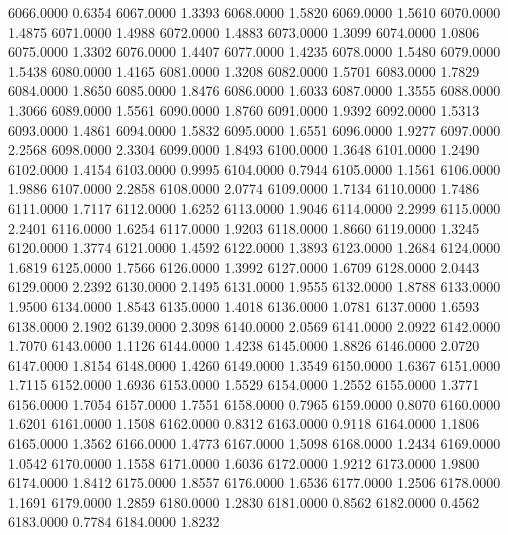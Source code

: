 6066.0000      0.6354
6067.0000      1.3393
6068.0000      1.5820
6069.0000      1.5610
6070.0000      1.4875
6071.0000      1.4988
6072.0000      1.4883
6073.0000      1.3099
6074.0000      1.0806
6075.0000      1.3302
6076.0000      1.4407
6077.0000      1.4235
6078.0000      1.5480
6079.0000      1.5438
6080.0000      1.4165
6081.0000      1.3208
6082.0000      1.5701
6083.0000      1.7829
6084.0000      1.8650
6085.0000      1.8476
6086.0000      1.6033
6087.0000      1.3555
6088.0000      1.3066
6089.0000      1.5561
6090.0000      1.8760
6091.0000      1.9392
6092.0000      1.5313
6093.0000      1.4861
6094.0000      1.5832
6095.0000      1.6551
6096.0000      1.9277
6097.0000      2.2568
6098.0000      2.3304
6099.0000      1.8493
6100.0000      1.3648
6101.0000      1.2490
6102.0000      1.4154
6103.0000      0.9995
6104.0000      0.7944
6105.0000      1.1561
6106.0000      1.9886
6107.0000      2.2858
6108.0000      2.0774
6109.0000      1.7134
6110.0000      1.7486
6111.0000      1.7117
6112.0000      1.6252
6113.0000      1.9046
6114.0000      2.2999
6115.0000      2.2401
6116.0000      1.6254
6117.0000      1.9203
6118.0000      1.8660
6119.0000      1.3245
6120.0000      1.3774
6121.0000      1.4592
6122.0000      1.3893
6123.0000      1.2684
6124.0000      1.6819
6125.0000      1.7566
6126.0000      1.3992
6127.0000      1.6709
6128.0000      2.0443
6129.0000      2.2392
6130.0000      2.1495
6131.0000      1.9555
6132.0000      1.8788
6133.0000      1.9500
6134.0000      1.8543
6135.0000      1.4018
6136.0000      1.0781
6137.0000      1.6593
6138.0000      2.1902
6139.0000      2.3098
6140.0000      2.0569
6141.0000      2.0922
6142.0000      1.7070
6143.0000      1.1126
6144.0000      1.4238
6145.0000      1.8826
6146.0000      2.0720
6147.0000      1.8154
6148.0000      1.4260
6149.0000      1.3549
6150.0000      1.6367
6151.0000      1.7115
6152.0000      1.6936
6153.0000      1.5529
6154.0000      1.2552
6155.0000      1.3771
6156.0000      1.7054
6157.0000      1.7551
6158.0000      0.7965
6159.0000      0.8070
6160.0000      1.6201
6161.0000      1.1508
6162.0000      0.8312
6163.0000      0.9118
6164.0000      1.1806
6165.0000      1.3562
6166.0000      1.4773
6167.0000      1.5098
6168.0000      1.2434
6169.0000      1.0542
6170.0000      1.1558
6171.0000      1.6036
6172.0000      1.9212
6173.0000      1.9800
6174.0000      1.8412
6175.0000      1.8557
6176.0000      1.6536
6177.0000      1.2506
6178.0000      1.1691
6179.0000      1.2859
6180.0000      1.2830
6181.0000      0.8562
6182.0000      0.4562
6183.0000      0.7784
6184.0000      1.8232

